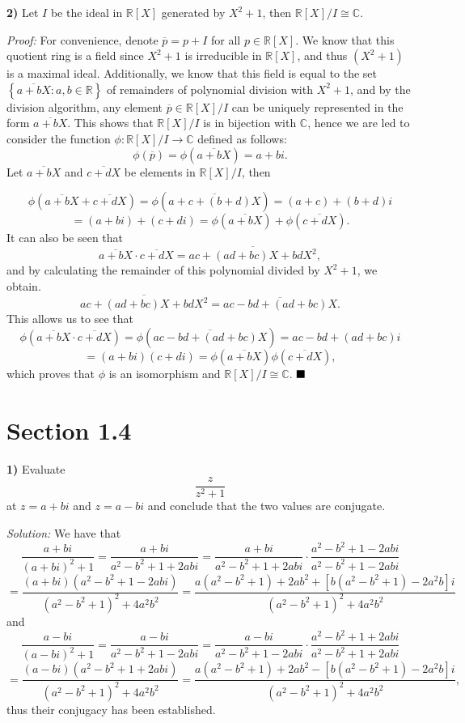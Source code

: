 \documentclass[12pt]{article}
\newcommand{\R}{\ensuremath{\mathbb{R}}}
\newcommand{\C}{\ensuremath{\mathbb{C}}}
\newcommand{\braceb}[1]{\left\{#1\right\}}
\newcommand{\parenb}[1]{\left(#1\right)}
\newcommand{\solution}{\textit{Solution: }}
\newcommand{\proof}{\textit{Proof: }}
\newcommand{\done}{\ensuremath{\strut\hfill\blacksquare}}
\begin{document}
\textbf{2)}
Let \( I \) be the ideal in \( \R[X] \) generated by \( X^2 + 1 \), then
\( \R[X]/I \cong \C \).

\proof
For convenience, denote \( \overline{p} = p + I \) for all \( p \in \R[X] \).
We know that this quotient ring is a field since \( X^2 + 1 \) is irreducible
in \( \R[X] \), and thus \( (X^2 + 1) \) is a maximal ideal.
Additionally, we know that this field is equal to the set
\( \braceb{\overline{a + bX} : a, b \in \R} \) of remainders of polynomial
division with \( X^2 + 1 \), and by the division algorithm, any element
\( \overline{p} \in \R[X]/I \) can be uniquely represented in the form
\( \overline{a + bX} \).
This shows that \( \R[X]/I \) is in bijection with \C, hence we are led to
consider the function \( \phi : \R[X]/I \to \C \) defined as follows:
\[
	\phi(\overline{p}) = \phi\parenb{\overline{a + bX}} = a + bi.
\]
Let \( \overline{a + bX} \) and \( \overline{c + dX} \) be elements in
\( \R[X]/I \), then

\[
	\phi\parenb{\overline{a + bX} + \overline{c + dX}}
	= \phi\parenb{\overline{a + c + (b + d)X}}
	= (a + c) + (b + d)i
\]
\[
	= (a + bi) + (c + di)
	= \phi\parenb{\overline{a + bX}} + \phi\parenb{\overline{c + dX}}.
\]
It can also be seen that
\[
	\overline{a + bX} \cdot \overline{c + dX}
	= \overline{ac + (ad + bc)X + bdX^2},
\]
and by calculating the remainder of this polynomial divided by \( X^2 + 1 \),
we obtain.
\[
	\overline{ac + (ad + bc)X + bdX^2}
	= \overline{ac - bd + (ad + bc)X}.
\]
This allows us to see that
\[
	\phi\parenb{\overline{a + bX} \cdot \overline{c + dX}}
	= \phi\parenb{\overline{ac - bd + (ad + bc)X}}
	= ac - bd + (ad + bc)i
\]
\[
	= (a + bi)(c + di)
	= \phi\parenb{\overline{a + bX}}\phi\parenb{\overline{c + dX}},
\]
which proves that \( \phi \) is an isomorphism and \( \R[X]/I \cong \C \).
\done

\section*{Section 1.4}

\textbf{1)}
Evaluate
\[
	\frac{z}{z^2 + 1}
\]
at \( z = a + bi \) and \( z = a - bi \) and conclude that the two values
are conjugate.

\solution
We have that
\[
	\frac{a + bi}{(a + bi)^2 + 1}
	= \frac{a + bi}{a^2 - b^2 + 1 + 2abi}
	= \frac{a + bi}{a^2 - b^2 + 1 + 2abi}
	\cdot \frac{a^2 - b^2 + 1 - 2abi}{a^2 - b^2 + 1 - 2abi}
\]
\[
	= \frac{
		(a + bi)(a^2 - b^2 + 1 - 2abi)
	}{
		(a^2 - b^2 + 1)^2 + 4a^2b^2
	}
	= \frac{
	a(a^2 - b^2 + 1) + 2ab^2 + [b(a^2 - b^2 + 1) - 2a^2b]i
	}{
	(a^2 - b^2 + 1)^2 + 4a^2b^2
	}
\]
and
\[
	\frac{a - bi}{(a - bi)^2 + 1}
	= \frac{a - bi}{a^2 - b^2 + 1 - 2abi}
	= \frac{a - bi}{a^2 - b^2 + 1 - 2abi}
	\cdot \frac{a^2 - b^2 + 1 + 2abi}{a^2 - b^2 + 1 + 2abi}
\]
\[
	= \frac{
		(a - bi)(a^2 - b^2 + 1 + 2abi)
	}{
		(a^2 - b^2 + 1)^2 + 4a^2b^2
	}
	= \frac{
	a(a^2 - b^2 + 1) + 2ab^2 - [b(a^2 - b^2 + 1) - 2a^2b]i
	}{
	(a^2 - b^2 + 1)^2 + 4a^2b^2
	},
\]
thus their conjugacy has been established.
\end{document}
